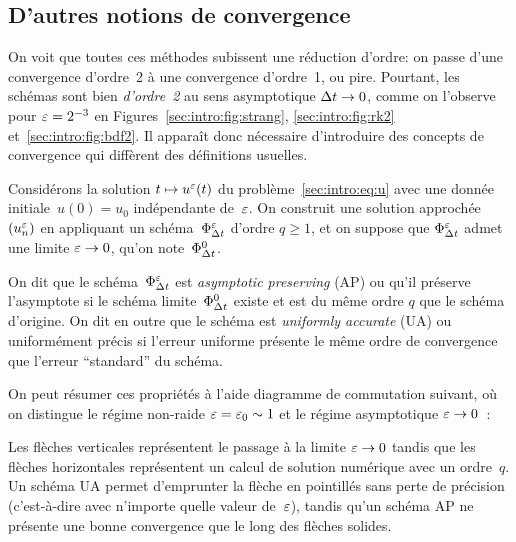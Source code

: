 \subsection*{D'autres notions de convergence}

On voit que toutes ces méthodes subissent une réduction d'ordre: on passe d'une convergence d'ordre~2 à une convergence d'ordre~1, ou pire. Pourtant, les schémas sont bien \textit{d'ordre~2} au sens asymptotique $\Delta t \rightarrow 0$, comme on l'observe pour $\varepsilon = 2^{-3}$ en Figures~\ref{sec:intro:fig:strang}, \ref{sec:intro:fig:rk2} et~\ref{sec:intro:fig:bdf2}. Il apparaît donc nécessaire d'introduire des concepts de convergence qui diffèrent des définitions usuelles. 

\begin{FRdefinition*}
    Considérons la solution $t \mapsto u^{\varepsilon}(t)$ du problème~\eqref{sec:intro:eq:u} avec une donnée initiale~$u(0) = u_0$ indépendante de~$\varepsilon$. On construit une solution approchée~$(u^{\varepsilon} _n)$ en appliquant un schéma~$\Phi^{\varepsilon} _{\Delta t}$ d'ordre $q \geq 1$, et on suppose que $\Phi^{\varepsilon}_{\Delta t}$ admet une limite $\varepsilon \rightarrow 0$, qu'on note~$\Phi^0_{\Delta t}$. 

    On dit que le schéma~$\Phi_{\Delta t}^{\varepsilon}$ est \emph{asymptotic preserving} (AP) ou qu'il préserve l'asymptote si le schéma limite~$\Phi^0_{\Delta t}$ existe et est du même ordre $q$ que le schéma d'origine. On dit en outre que le schéma est \emph{uniformly accurate} (UA) ou uniformément précis si l'erreur uniforme présente le même ordre de convergence que l'erreur \enquote{standard} du schéma. 
\end{FRdefinition*}

On peut résumer ces propriétés à l'aide diagramme de commutation suivant, où on distingue le régime non-raide $\varepsilon = \varepsilon_0 \sim 1$ et le régime asymptotique $\varepsilon \rightarrow 0$~:
\begin{center}
\end{center}
Les flèches verticales représentent le passage à la limite $\varepsilon \rightarrow 0$ tandis que les flèches horizontales représentent un calcul de solution numérique avec un ordre~$q$. Un schéma UA permet d'emprunter la flèche en pointillés sans perte de précision (c'est-à-dire avec n'importe quelle valeur de~$\varepsilon$), tandis qu'un schéma AP ne présente une bonne convergence que le long des flèches solides. 


